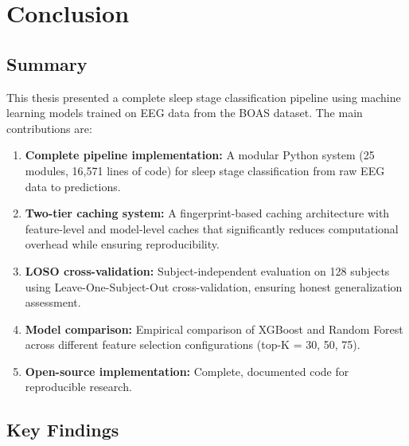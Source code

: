 \chapter{Conclusion}
\label{ch:conclusion}


\section{Summary}
\label{sec:conclusion_summary}

This thesis presented a complete sleep stage classification pipeline using machine learning models trained on EEG data from the BOAS dataset. The main contributions are:

\begin{enumerate}
    \item \textbf{Complete pipeline implementation:} A modular Python system (25 modules, 16,571 lines of code) for sleep stage classification from raw EEG data to predictions.

    \item \textbf{Two-tier caching system:} A fingerprint-based caching architecture with feature-level and model-level caches that significantly reduces computational overhead while ensuring reproducibility.

    \item \textbf{LOSO cross-validation:} Subject-independent evaluation on 128 subjects using Leave-One-Subject-Out cross-validation, ensuring honest generalization assessment.

    \item \textbf{Model comparison:} Empirical comparison of XGBoost and Random Forest across different feature selection configurations (top-K = 30, 50, 75).

    \item \textbf{Open-source implementation:} Complete, documented code for reproducible research.
\end{enumerate}

\section{Key Findings}
\label{sec:key_findings}



